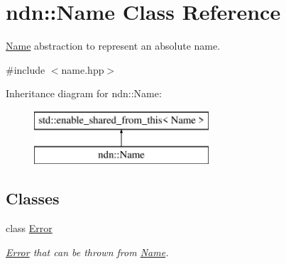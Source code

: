 \hypertarget{classndn_1_1Name}{}\section{ndn\+:\+:Name Class Reference}
\label{classndn_1_1Name}


\hyperlink{classndn_1_1Name}{Name} abstraction to represent an absolute name.  




{\ttfamily \#include $<$name.\+hpp$>$}

Inheritance diagram for ndn\+:\+:Name\+:\begin{figure}[H]
\begin{center}
\leavevmode
\includegraphics[height=2.000000cm]{classndn_1_1Name}
\end{center}
\end{figure}
\subsection*{Classes}
\begin{DoxyCompactItemize}
\item 
class \hyperlink{classndn_1_1Name_1_1Error}{Error}
\begin{DoxyCompactList}\small\item\em \hyperlink{classndn_1_1Name_1_1Error}{Error} that can be thrown from \hyperlink{classndn_1_1Name}{Name}. \end{DoxyCompactList}\end{DoxyCompactItemize}
